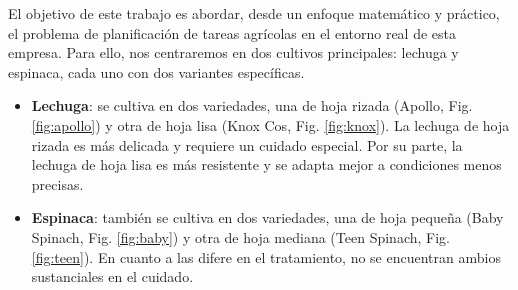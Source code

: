 El objetivo de este trabajo es abordar, desde un enfoque matemático y práctico, el problema de planificación de tareas agrícolas en el entorno real de esta empresa.
Para ello, nos centraremos en dos cultivos principales: lechuga y espinaca, cada uno con dos variantes específicas.
\begin{itemize}
    \item \textbf{Lechuga}: se cultiva en dos variedades, una de hoja rizada (Apollo, Fig. \ref{fig:apollo}) y otra de hoja lisa (Knox Cos, Fig. \ref{fig:knox}). La lechuga de hoja rizada es más delicada y requiere un cuidado especial. Por su parte, la lechuga de hoja lisa es más resistente y se adapta mejor a condiciones menos precisas.
    \item \textbf{Espinaca}: también se cultiva en dos variedades, una de hoja pequeña (Baby Spinach, Fig. \ref{fig:baby}) y otra de hoja mediana (Teen Spinach, Fig. \ref{fig:teen}). En cuanto a las difere en el tratamiento, no se encuentran ambios sustanciales en el cuidado.
\end{itemize}

